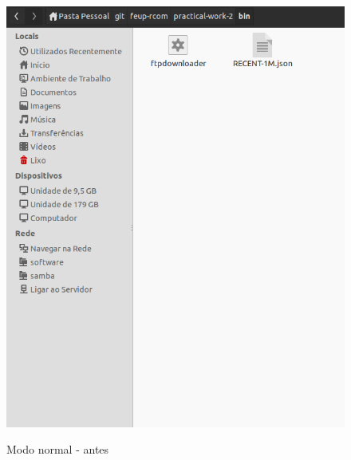 \documentclass[a4paper]{article}
\begin{document}
\begin{figure}[h!]
\centering
\caption{Modo normal - antes}
\includegraphics[scale=0.35]{res/depois-modoanonimo.png}
\label{fig:antesnormal}
\end{figure}
\end{document}

